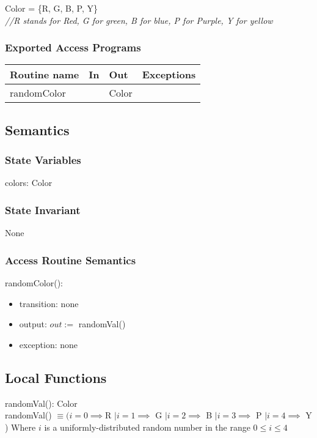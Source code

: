 \documentclass[12pt]{article}
\begin{document}
Color = \{R, G, B, P, Y\}\\

\noindent \textit{//R stands for Red, G for green, B for blue, P for
  Purple, Y for yellow}

\subsubsection* {Exported Access Programs}

\begin{tabular}{| l | l | l | p{5cm} |}
\hline
\textbf{Routine name} & \textbf{In} & \textbf{Out} & \textbf{Exceptions}\\
\hline
randomColor &  & Color & ~\\
\hline
\end{tabular}

\subsection* {Semantics}

\subsubsection* {State Variables}

colors: Color

\subsubsection* {State Invariant}

None

\subsubsection* {Access Routine Semantics}

\noindent randomColor():
\begin{itemize}
\item transition: none
\item output: $out :=$ randomVal()
\item exception: none
\end{itemize}


\subsection*{Local Functions}

\noindent randomVal(): Color\\
\noindent randomVal() $\equiv (i = 0 \implies $R $| i = 1 \implies$ G $| i = 2 \implies$ B $| i = 3 \implies$ P $| i = 4 \implies$ Y ) 
Where $i$ is a uniformly-distributed random number in the range $0 \leq i \leq 4$ \\
\end{document}
